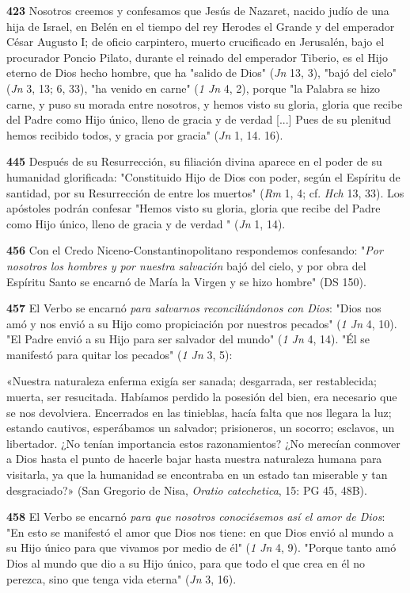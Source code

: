 \documentclass[]{article}
\begin{document}
\textbf{423} Nosotros creemos y confesamos que Jesús de Nazaret, nacido
judío de una hija de Israel, en Belén en el tiempo del rey Herodes el
Grande y del emperador César Augusto I; de oficio carpintero, muerto
crucificado en Jerusalén, bajo el procurador Poncio Pilato, durante el
reinado del emperador Tiberio, es el Hijo eterno de Dios hecho hombre,
que ha "salido de Dios" (\emph{Jn} 13, 3), "bajó del cielo" (\emph{Jn}
3, 13; 6, 33), "ha venido en carne" (\emph{1 Jn} 4, 2), porque "la
Palabra se hizo carne, y puso su morada entre nosotros, y hemos visto su
gloria, gloria que recibe del Padre como Hijo único, lleno de gracia y
de verdad {[}...{]} Pues de su plenitud hemos recibido todos, y gracia
por gracia" (\emph{Jn} 1, 14. 16).

\textbf{445} Después de su Resurrección, su filiación divina aparece en
el poder de su humanidad glorificada: "Constituido Hijo de Dios con
poder, según el Espíritu de santidad, por su Resurrección de entre los
muertos" (\emph{Rm} 1, 4; cf. \emph{Hch} 13, 33). Los apóstoles podrán
confesar "Hemos visto su gloria, gloria que recibe del Padre como Hijo
único, lleno de gracia y de verdad " (\emph{Jn} 1, 14).

\textbf{456} Con el Credo Niceno-Constantinopolitano respondemos
confesando: "\emph{Por nosotros los hombres y por nuestra salvación}
bajó del cielo, y por obra del Espíritu Santo se encarnó de María la
Virgen y se hizo hombre" (DS 150).

\textbf{457} El Verbo se encarnó \emph{para salvarnos reconciliándonos
con Dios}: "Dios nos amó y nos envió a su Hijo como propiciación por
nuestros pecados" (\emph{1 Jn} 4, 10). "El Padre envió a su Hijo para
ser salvador del mundo" (\emph{1 Jn} 4, 14). "Él se manifestó para
quitar los pecados" (\emph{1 Jn} 3, 5):

«Nuestra naturaleza enferma exigía ser sanada; desgarrada, ser
restablecida; muerta, ser resucitada. Habíamos perdido la posesión del
bien, era necesario que se nos devolviera. Encerrados en las tinieblas,
hacía falta que nos llegara la luz; estando cautivos, esperábamos un
salvador; prisioneros, un socorro; esclavos, un libertador. ¿No tenían
importancia estos razonamientos? ¿No merecían conmover a Dios hasta el
punto de hacerle bajar hasta nuestra naturaleza humana para visitarla,
ya que la humanidad se encontraba en un estado tan miserable y tan
desgraciado?» (San Gregorio de Nisa, \emph{Oratio catechetica}, 15: PG
45, 48B).

\textbf{458} El Verbo se encarnó \emph{para que nosotros conociésemos
así el amor de Dios}: "En esto se manifestó el amor que Dios nos tiene:
en que Dios envió al mundo a su Hijo único para que vivamos por medio de
él" (\emph{1 Jn} 4, 9). "Porque tanto amó Dios al mundo que dio a su
Hijo único, para que todo el que crea en él no perezca, sino que tenga
vida eterna" (\emph{Jn} 3, 16).
\end{document}
